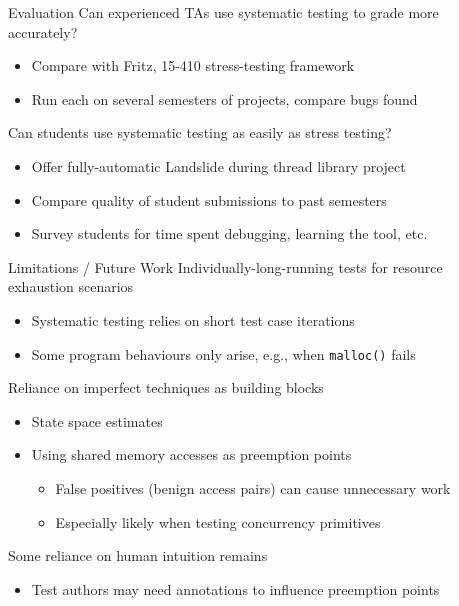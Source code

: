\documentclass[xcolor=dvipsnames]{beamer}
\begin{document}
\begin{frame}{Evaluation}
	Can experienced TAs use systematic testing to grade more accurately?
	\begin{itemize}
		\item Compare with Fritz, 15-410 stress-testing framework
		\item Run each on several semesters of projects, compare bugs found
	\end{itemize}
	\pause
	\linegap

	Can students use systematic testing as easily as stress testing?
	\begin{itemize}
		\item Offer fully-automatic Landslide during thread library project
		\item Compare quality of student submissions to past semesters
		\item Survey students for time spent debugging, learning the tool, etc.
	\end{itemize}
\end{frame}

\begin{frame}{Limitations / Future Work}
	Individually-long-running tests for resource exhaustion scenarios
	\begin{itemize}
		\item Systematic testing relies on short test case iterations
		\item Some program behaviours only arise, e.g., when \texttt{malloc()} fails
	\end{itemize}
	\pause
	\linegap

	Reliance on imperfect techniques as building blocks
	\begin{itemize}
		\item State space estimates
		\item Using shared memory accesses as preemption points
			\begin{itemize}
				\item False positives (benign access pairs) can cause unnecessary work
				\item Especially likely when testing concurrency primitives
			\end{itemize}
	\end{itemize}
	\pause
	\linegap

	Some reliance on human intuition remains
	\begin{itemize}
		\item Test authors may need annotations to influence preemption points
	\end{itemize}
\end{frame}
\end{document}
